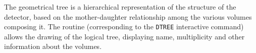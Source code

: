             
            

The geometrical tree is a hierarchical representation of the 
structure of the detector, based on the mother-daughter
relationship among the various volumes composing it. The  
routine (corresponding to the {\tt DTREE} interactive command) allows 
the drawing of the logical tree, displaying name, multiplicity 
and other information about the volumes.

